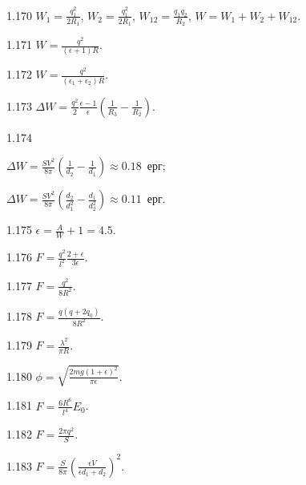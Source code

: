 \begin{Solution}{1.{170}}
	$W_1 = \frac{q_1^2}{2R_1}$, $W_2 = \frac{q_1^2}{2R_1}$, $W_{12} = \frac{q_1q_2}{R_2}$, $W = W_1 + W_2 + W_{12}$.
\end{Solution}
\begin{Solution}{1.{171}}
	$W = \frac{q^2}{(\epsilon + 1)R}$.
\end{Solution}
\begin{Solution}{1.{172}}
	$W = \frac{q^2}{(\epsilon_1 + \epsilon_2)R}$.
\end{Solution}
\begin{Solution}{1.{173}}
	$\Delta W = \frac{q^2}{2}\frac{\epsilon - 1}{\epsilon} \left( \frac{1}{R_3} - \frac{1}{R_2} \right) $.
\end{Solution}
\begin{Solution}{1.{174}}
	\begin{enumerate*}[label=\alph*)]
		\item $\Delta W = \frac{SV^2}{8\pi}\left( \frac{1}{d_2} - \frac{1}{d_1}\right) \approx 0.18$~ерг;
		\item $\Delta W = \frac{SV^2}{8\pi}\left( \frac{d_2}{d_1^2} - \frac{d_1}{d_2^2}\right) \approx 0.11$~ерг.
	\end{enumerate*}
\end{Solution}
\begin{Solution}{1.{175}}
	$\epsilon = \frac{A}{W} + 1 = 4.5$.
\end{Solution}
\begin{Solution}{1.{176}}
	$ F = \frac{q^2}{l^2} \frac{2 + \epsilon}{3\epsilon}.$
\end{Solution}
\begin{Solution}{1.{177}}
	$F = \frac{q^2}{8R^2}$.
\end{Solution}
\begin{Solution}{1.{178}}
	$F = \frac{q(q + 2q_0)}{8R^2}$.
\end{Solution}
\begin{Solution}{1.{179}}
	$F = \frac{\lambda^2}{\pi R}$.
\end{Solution}
\begin{Solution}{1.{180}}
	$\phi = \sqrt{\frac{2mg(1+\epsilon)^2}{\pi\epsilon}}$.
\end{Solution}
\begin{Solution}{1.{181}}
	$F = \frac{6R^6}{l^4} E_0$.
\end{Solution}
\begin{Solution}{1.{182}}
	$F = \frac{2\pi q^2}{S}$.
\end{Solution}
\begin{Solution}{1.{183}}
	$ F = \frac{S}{8\pi} \left( \frac{\epsilon V}{ \epsilon d_1 + d_2} \right)^2 $.
\end{Solution}

